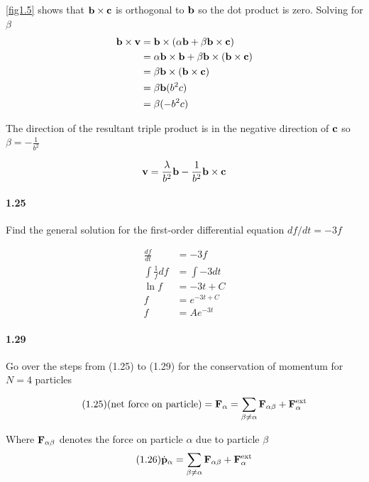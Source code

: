 \documentclass[../problems.tex]{subfiles}
\begin{document}
\ref{fig1.5} shows that $\mathbf{b} \times \mathbf{c}$ is orthogonal to $\mathbf{b}$ so the dot 
product is zero. Solving for $\beta$
\begin{align*}
    \mathbf{b} \times \mathbf{v} &= \mathbf{b} \times (\alpha \mathbf{b} 
    + \beta \mathbf{b} \times \mathbf{c}) \\
    &= \alpha \mathbf{b} \times \mathbf{b} + \beta \mathbf{b} \times (\mathbf{b} \times \mathbf{c}) \\
    &= \beta \mathbf{b} \times (\mathbf{b} \times \mathbf{c}) \\
    &= \beta \mathbf{b} (b^2 c) \\
    &= \beta (-b^2 c) 
\end{align*}

The direction of the resultant triple product is in the negative direction of $\mathbf{c}$ so 
$\beta = -\frac{1}{b^2}$

\begin{equation*}
    \mathbf{v} = \frac{\lambda}{b^2} \mathbf{b} - \frac{1}{b^2} \mathbf{b} \times \mathbf{c}
\end{equation*}

\paragraph{1.25}
Find the general solution for the first-order differential equation $df/dt = -3f$
\barh
    
\begin{align*}
    \frac{df}{dt} &= -3f \\
    \int \frac{1}{f} df &= \int -3 dt \\
    \ln{f} &= -3t + C \\
    f &= e^{-3t + C} \\
    f &= Ae^{-3t}
\end{align*}

\paragraph{1.29} 
Go over the steps from (1.25) to (1.29) for the conservation of momentum for $N=4$ particles
\barh

\begin{equation} \tag{1.25} \label{eq1.25}
    (\text{net force on particle}) = \mathbf{F}_\alpha =
    \sum_{\beta \neq \alpha} \mathbf{F}_{\alpha \beta} + \mathbf{F}_{\alpha}^\text{ext}
\end{equation}

Where $\mathbf{F}_{\alpha \beta}$ denotes the force on particle $\alpha$ due to particle $\beta$
\begin{equation} \tag{1.26} \label{eq1.26}
    \dot{\mathbf{p}}_\alpha = \sum_{\beta \neq \alpha} \mathbf{F}_{\alpha \beta} 
    + \mathbf{F}_{\alpha}^\text{ext}
\end{equation}
\end{document}
